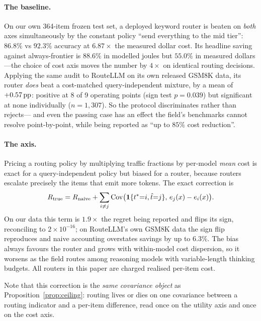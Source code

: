 \paragraph{The baseline.} On our own 364-item frozen test set, a deployed
keyword router is beaten on \emph{both} axes simultaneously by the constant
policy ``send everything to the mid tier'': $86.8\%$ vs $92.3\%$ accuracy at
$6.87\times$ the measured dollar cost. Its headline saving against
always-frontier is $88.6\%$ in modelled joules but $55.0\%$ in measured
dollars---the choice of cost axis moves the number by $4\times$ on identical
routing decisions. Applying the same audit to RouteLLM
\citep{ong2024routellm} on its own released GSM8K data, its router \emph{does}
beat a cost-matched query-independent mixture, by a mean of $+0.57\,\text{pp}$: positive
at 8 of 9 operating points (sign test $p=0.039$) but significant at none
individually ($n=1{,}307$). So the protocol discriminates rather than rejects---
and even the passing case has an effect the field's benchmarks cannot resolve
point-by-point, while being reported as ``up to $85\%$ cost reduction''.

\paragraph{The axis.} Pricing a routing policy by multiplying traffic fractions
by per-model \emph{mean} cost is exact for a query-independent policy but biased
for a router, because routers escalate precisely the items that emit more
tokens. The exact correction is
\[
R_{\text{true}}=R_{\text{naive}}+\sum_{i\ne j}\mathrm{Cov}\bigl(\mathbf 1\{t^*{=}i,\hat t{=}j\},\,e_j(x)-e_i(x)\bigr).
\]
On our data this term is $1.9\times$ the regret being reported and flips its
sign, reconciling to $2\times10^{-16}$; on RouteLLM's own GSM8K data the sign
flip reproduces and naive accounting overstates savings by up to $6.3\%$. The
bias always favours the router and grows with within-model cost dispersion, so
it worsens as the field routes among reasoning models with variable-length
thinking budgets. All routers in this paper are charged realised per-item cost.

Note that this correction is the \emph{same covariance object} as
Proposition~\ref{prop:ceiling}: routing lives or dies on one covariance between
a routing indicator and a per-item difference, read once on the utility axis and
once on the cost axis.
